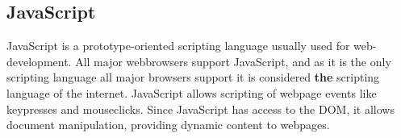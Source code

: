 \subsection{JavaScript}

JavaScript is a prototype-oriented scripting language usually used for
web-development. All major webbrowsers support JavaScript, and as it is the only
scripting language all major browsers support it is considered \textbf{the}
scripting language of the internet. 
JavaScript allows scripting of webpage events like keypresses and mouseclicks.
Since JavaScript has access to the DOM, it allows document manipulation, providing dynamic content to webpages.